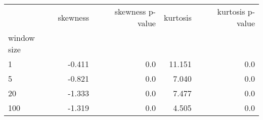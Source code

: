 \begin{tabular}{lrrrr}
\toprule
{} &  skewness &  skewness p-value &  kurtosis &  kurtosis p-value \\
window size &           &                   &           &                   \\
\midrule
1           &    -0.411 &               0.0 &    11.151 &               0.0 \\
5           &    -0.821 &               0.0 &     7.040 &               0.0 \\
20          &    -1.333 &               0.0 &     7.477 &               0.0 \\
100         &    -1.319 &               0.0 &     4.505 &               0.0 \\
\bottomrule
\end{tabular}
